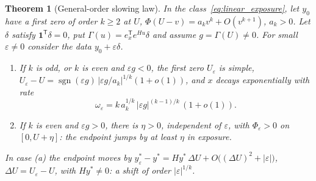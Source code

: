 \documentclass[11pt,a4paper]{article}
\newtheorem{theorem}{Theorem}[section]
\theoremstyle{definition}\newtheorem{definition}[theorem]{Definition}
\theoremstyle{remark}\newtheorem{remark}[theorem]{Remark}
\newcommand{\one}{\mathbf 1}
\begin{document}
\begin{theorem}[General-order slowing law]
\label{thm:slowing}
In the class~\eqref{eq:linear_exposure}, let $y_0$ have a first zero of
order $k\ge2$ at $U$, $\Phi(U-v)=a_kv^k+O(v^{k+1})$, $a_k>0$. Let
$\delta$ satisfy $\one^{\mathsf T}\delta=0$, put
$\Gamma(u)=e_x^{\mathsf T}e^{Hu}\delta$ and assume $g=\Gamma(U)\ne0$.
For small $\varepsilon\ne0$ consider the data $y_0+\varepsilon\delta$.
\begin{enumerate}[label=(\alph*)]
\item If $k$ is odd, or $k$ is even and $\varepsilon g<0$, the first
zero $U_\varepsilon$ is simple,
$U_\varepsilon-U=\operatorname{sgn}(\varepsilon g)\,|\varepsilon g/a_k|^{1/k}(1+o(1))$,
and $x$ decays exponentially with rate
\begin{equation}
\omega_\varepsilon=k\,a_k^{1/k}\,|\varepsilon g|^{(k-1)/k}\,(1+o(1)).
\label{eq:slowinglaw}
\end{equation}
\item If $k$ is even and $\varepsilon g>0$, there is $\eta>0$,
independent of $\varepsilon$, with $\Phi_\varepsilon>0$ on $[0,U+\eta]$:
the endpoint jumps by at least $\eta$ in exposure.
\end{enumerate}
In case (a) the endpoint moves by
$y^*_\varepsilon-y^*=Hy^*\,\Delta U+O\bigl((\Delta U)^2+|\varepsilon|\bigr)$,
$\Delta U=U_\varepsilon-U$, with $Hy^*\ne0$: a shift of order
$|\varepsilon|^{1/k}$.
\end{theorem}
\end{document}

